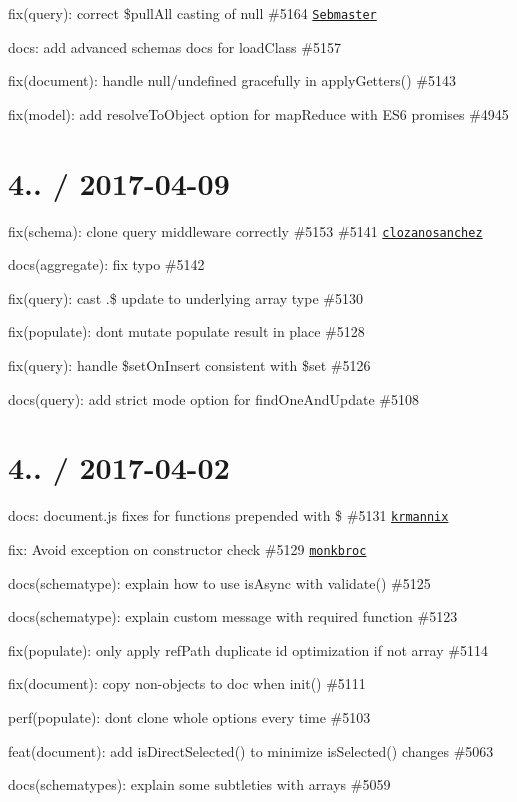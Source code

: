 \begin{DoxyItemize}
\item fix(query)\+: correct \$pull\+All casting of null \#5164 \href{https://github.com/Sebmaster}{\tt Sebmaster}
\item docs\+: add advanced schemas docs for load\+Class \#5157
\item fix(document)\+: handle null/undefined gracefully in apply\+Getters() \#5143
\item fix(model)\+: add resolve\+To\+Object option for map\+Reduce with E\+S6 promises \#4945
\end{DoxyItemize}

\section*{4.. / 2017-\/04-\/09 }


\begin{DoxyItemize}
\item fix(schema)\+: clone query middleware correctly \#5153 \#5141 \href{https://github.com/clozanosanchez}{\tt clozanosanchez}
\item docs(aggregate)\+: fix typo \#5142
\item fix(query)\+: cast .\$ update to underlying array type \#5130
\item fix(populate)\+: don\textquotesingle{}t mutate populate result in place \#5128
\item fix(query)\+: handle \$set\+On\+Insert consistent with \$set \#5126
\item docs(query)\+: add strict mode option for find\+One\+And\+Update \#5108
\end{DoxyItemize}

\section*{4.. / 2017-\/04-\/02 }


\begin{DoxyItemize}
\item docs\+: document.\+js fixes for functions prepended with {\ttfamily \$} \#5131 \href{https://github.com/krmannix}{\tt krmannix}
\item fix\+: Avoid exception on constructor check \#5129 \href{https://github.com/monkbroc}{\tt monkbroc}
\item docs(schematype)\+: explain how to use {\ttfamily is\+Async} with validate() \#5125
\item docs(schematype)\+: explain custom message with required function \#5123
\item fix(populate)\+: only apply ref\+Path duplicate id optimization if not array \#5114
\item fix(document)\+: copy non-\/objects to doc when init() \#5111
\item perf(populate)\+: dont clone whole options every time \#5103
\item feat(document)\+: add is\+Direct\+Selected() to minimize is\+Selected() changes \#5063
\item docs(schematypes)\+: explain some subtleties with arrays \#5059
\end{DoxyItemize}

